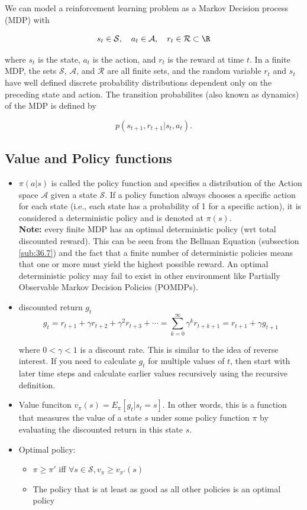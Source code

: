 \documentclass[12pt]{article}
\begin{document}
We can model a reinforcement learning problem as a Markov Decision process (MDP) with

\[ s_t \in \mathcal{S}, \quad a_t \in \mathcal{A}, \quad r_t \in \mathcal{R} \subset \R \]

where $s_t$ is the state, $a_t$ is the action, and $r_t$ is the reward at time $t$. In a finite MDP, the sets $\mathcal{S}$, $\mathcal{A}$, and $\mathcal{R}$ are all finite sets, and the random variable $r_t$ and $s_t$ have well defined discrete probability distributions dependent only on the preceding state and action. The transition probabilites (also known as dynamics) of the MDP is defined by

\[ p(s_{t+1}, r_{t+1} | s_t, a_t). \]

\newpage

\subsection{Value and Policy functions}
\begin{itemize}
	\item $\pi(a|s)$ is called the policy function and specifies a distribution of the Action space $\mathcal{A}$ given a state $\mathcal{S}$. If a policy function always chooses a specific action for each state (i.e., each state has a probability of 1 for a specific action), it is considered a deterministic policy and is denoted at $\pi(s)$.\\

		\textbf{Note:} every finite MDP has an optimal deterministic policy (wrt total discounted reward). This can be seen from the Bellman Equation (subsection \ref{sub:36.7}) and the fact that a finite number of deterministic policies means that one or more must yield the highest possible reward. An optimal deterministic policy may fail to exist in other environment like Partially Observable Markov Decision Policies (POMDPs).
	\item discounted return $g_t$
		\[ g_t = r_{t+1} + \gamma r_{t+2} + \gamma^2 r_{t+3} + \cdots = \sum_{k=0}^{\infty} \gamma^k r_{t+k+1} = r_{t+1} + \gamma g_{t+1}  \]

		where $0 < \gamma < 1$ is a discount rate. This is similar to the idea of reverse interest. If you need to calculate $g_t$ for multiple values of $t$, then start with later time steps and calculate earlier values recursively using the recursive definition.

	\item Value funciton $v_{\pi}(s) = E_{\pi}[g_t|s_t = s]$. In other words, this is a function that measures the value of a state $s$ under some policy function $\pi$ by evaluating the discounted return in this state $s$.

	\item Optimal policy:
		\begin{itemize}
			\item $\pi \ge \pi'$ iff $\forall s \in \mathcal{S}, v_{\pi} \ge v_{\pi'} (s)$
			\item The policy that is at least as good as all other policies is an optimal policy
		\end{itemize}
\end{itemize}
\end{document}
